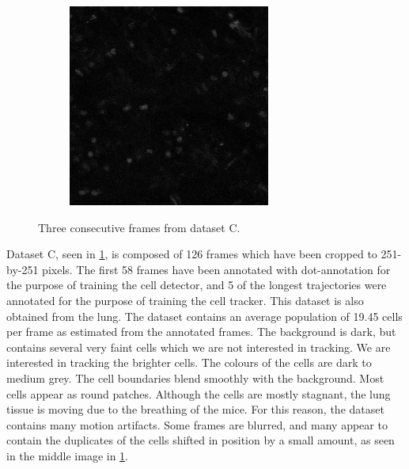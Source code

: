\begin{figure}[h]
\begin{subfigure}{.32\textwidth}
    	\end{subfigure}
   		\hfill
  	    \begin{subfigure}{.32\textwidth}
   	  		\includegraphics[width=\textwidth]{images/series13greencropped010}
  	    \end{subfigure}
    	\caption{Three consecutive frames from dataset C.}
    	\label{fig:data_datasetC}
    \end{figure}
        
    Dataset C, seen in \cref{fig:data_datasetC}, is composed of 126 frames which have been cropped to 251-by-251 pixels. The first 58 frames have been annotated with dot-annotation for the purpose of training the cell detector, and 5 of the longest trajectories were annotated for the purpose of training the cell tracker. This dataset is also obtained from the lung. The dataset contains an average population of 19.45 cells per frame as estimated from the annotated frames. The background is dark, but contains several very faint cells which we are not interested in tracking. We are interested in tracking the brighter cells. The colours of the cells are dark to medium grey. The cell boundaries blend smoothly with the background. Most cells appear as round patches. Although the cells are mostly stagnant, the lung tissue is moving due to the breathing of the mice. For this reason, the dataset contains many motion artifacts. Some frames are blurred, and many appear to contain the duplicates of the cells shifted in position by a small amount, as seen in the middle image in \cref{fig:data_datasetC}.

